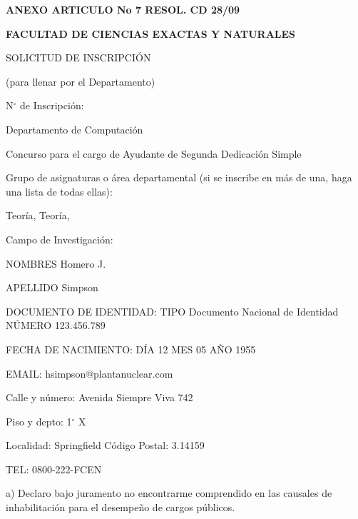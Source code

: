 \documentclass{article}
\newcommand{\cargo}[1]{\noindent Concurso para el cargo de {#1} \hspace{0.5cm} Dedicación Simple}
\newcommand{\areas}[3]{\noindent Grupo de asignaturas o área departamental (si se inscribe en más de una, haga una lista de todas ellas):

\medskip

\noindent {#1}\def\temp{#2}\ifx\temp\empty \else, {#2}\fi\def\temp{#3}\ifx\temp\empty \else, {#3} \fi}
\newcommand{\apellido}[1]{\noindent APELLIDO {#1}}
\newcommand{\nombre}[1]{\noindent NOMBRES {#1}}
\newcommand{\dni}[1]{\noindent DOCUMENTO DE IDENTIDAD: TIPO Documento Nacional de Identidad \hspace{0.25cm} NÚMERO {#1}}
\newcommand{\fechaNacimiento}[3]{\noindent FECHA DE NACIMIENTO: DÍA {#1} \hspace{0.1cm} MES {#2} {\hspace{0.1cm}} AÑO {#3}}
\newcommand{\domicilio}[5]{\noindent Calle y número: {#1}

\noindent Piso y depto: {#2}

\noindent Localidad: {#3} {\hspace{3cm}} Código Postal: {#4}

\noindent TEL: {#5}
}
\newcommand{\email}[1]{\noindent EMAIL: {#1}}
\newcommand{\legajo}[1]{\noindent NÚMERO DE LEGAJO: {#1}}
\begin{document}
\begin{center}
{\bf ANEXO ARTICULO No 7 RESOL. CD 28/09}
\end{center}
{\bf \noindent FACULTAD DE CIENCIAS EXACTAS Y NATURALES

\noindent SOLICITUD DE INSCRIPCIÓN}

\bigskip

\noindent (para llenar por el Departamento) 

\bigskip

\noindent N$^\circ$ de Inscripción: \hdashrule{4cm}{0.5pt}{0.75pt}

\medskip

\noindent Departamento de Computación

\cargo{Ayudante de Segunda}

\areas{Algoritmos}{Teoría}{}

\medskip

\noindent \hdashrule{\linewidth}{0.5pt}{0.75pt}

\noindent Campo de Investigación:

\medskip

\noindent \hdashrule{\linewidth}{0.5pt}{0.75pt}

\medskip

\noindent \hdashrule{\linewidth}{0.5pt}{0.75pt}

\medskip

\noindent \hrulefill

\bigskip

\nombre{Homero J.}

\medskip

\apellido{Simpson}

\medskip

\dni{123.456.789}

\medskip

\fechaNacimiento{12}{05}{1955}

\medskip

\email{hsimpson@plantanuclear.com}

% 

\bigskip

\domicilio{Avenida Siempre Viva 742}{1$^\circ$ X}{Springfield}{3.14159}{0800-222-FCEN}

\bigskip
\bigskip
\bigskip
\bigskip


\noindent a) Declaro bajo juramento no encontrarme comprendido en las causales
de inhabilitación para el desempeño de cargos públicos.
\end{document}
